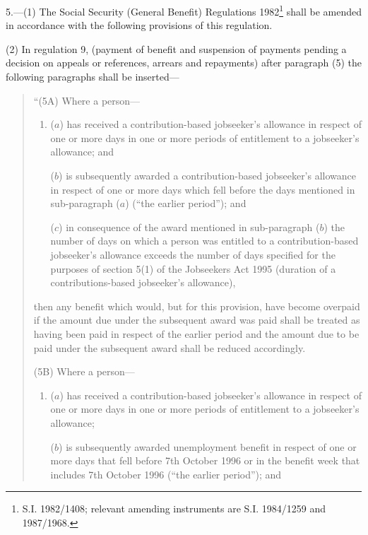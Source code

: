 \documentclass[a4paper]{article}
\begin{document}
\begin{sloppypar}
5.—(1) The Social Security (General Benefit) Regulations 1982\footnote{\frenchspacing S.I. 1982/1408; relevant amending instruments are S.I. 1984/1259 and 1987/1968.} shall be amended in accordance with the following provisions of this regulation.
\end{sloppypar}

(2) In regulation 9, (payment of benefit and suspension of payments pending a decision on appeals or references, arrears and repayments) after paragraph (5) the following paragraphs shall be inserted—
\begin{quotation}
“(5A) Where a person—
\begin{enumerate}\item[]
($a$) has received a contribution-based jobseeker’s allowance in respect of one or more days in one or more periods of entitlement to a jobseeker’s allowance; and

($b$) is subsequently awarded a contribution-based jobseeker’s allowance in respect of one or more days which fell before the days mentioned in sub-paragraph ($a$) (“the earlier period”); and

($c$) in consequence of the award mentioned in sub-paragraph ($b$) the number of days on which a person was entitled to a contribution-based jobseeker’s allowance exceeds the number of days specified for the purposes of section 5(1) of the Jobseekers Act 1995 (duration of a contributions-based jobseeker’s allowance),
\end{enumerate}
then any benefit which would, but for this provision, have become overpaid if the amount due under the subsequent award was paid shall be treated as having been paid in respect of the earlier period and the amount due to be paid under the subsequent award shall be reduced accordingly.

(5B) Where a person—
\begin{enumerate}\item[]
($a$) has received a contribution-based jobseeker’s allowance in respect of one or more days in one or more periods of entitlement to a jobseeker’s allowance;

($b$) is subsequently awarded unemployment benefit in respect of one or more days that fell before 7th October 1996 or in the benefit week that includes 7th October 1996 (“the earlier period”); and


\end{enumerate}
\end{quotation}
\end{document}
